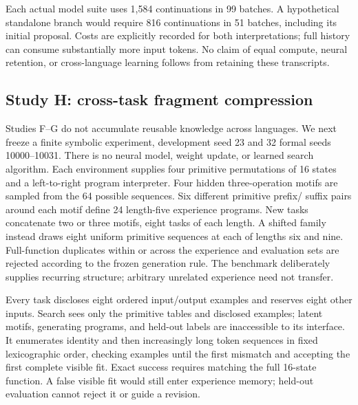 \documentclass[11pt]{article}
\begin{document}
Each actual model suite uses 1,584 continuations in 99 batches. A hypothetical
standalone branch would require 816 continuations in 51 batches, including its
initial proposal. Costs are explicitly recorded for both interpretations;
full history can consume substantially more input tokens. No claim of equal
compute, neural retention, or cross-language learning follows from retaining
these transcripts.

\subsection{Study H: cross-task fragment compression}
Studies F--G do not accumulate reusable knowledge across languages. We next
freeze a finite symbolic experiment, development seed 23 and 32 formal seeds
10000--10031. There is no neural model, weight update, or learned search
algorithm. Each environment supplies four primitive permutations of 16 states
and a left-to-right program interpreter. Four hidden three-operation motifs
are sampled from the 64 possible sequences. Six different primitive prefix/
suffix pairs around each motif define 24 length-five experience programs.
New tasks concatenate two or three motifs, eight tasks of each length. A
shifted family instead draws eight uniform primitive sequences at each of
lengths six and nine. Full-function duplicates within or across the experience
and evaluation sets are rejected according to the frozen generation rule.
The benchmark deliberately supplies recurring structure; arbitrary unrelated
experience need not transfer.

Every task discloses eight ordered input/output examples and reserves eight
other inputs. Search sees only the primitive tables and disclosed examples;
latent motifs, generating programs, and held-out labels are inaccessible to
its interface. It enumerates identity and then increasingly long token
sequences in fixed lexicographic order, checking examples until the first
mismatch and accepting the first complete visible fit. Exact success requires
matching the full 16-state function. A false visible fit would still enter
experience memory; held-out evaluation cannot reject it or guide a revision.
\end{document}
